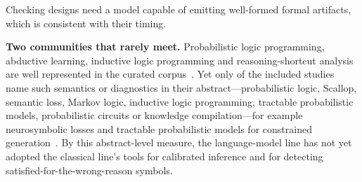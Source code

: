 Checking designs need a model capable of emitting well-formed formal artifacts, which is consistent with their timing.

\textbf{Two communities that rarely meet.} Probabilistic logic programming, abductive learning, inductive logic programming and reasoning-shortcut analysis are well represented in the curated corpus~\cite{huang2021scallop,maene2024hardness,marconato2023neuro,yang2024analysis}. Yet only  of the  included studies name such semantics or diagnostics in their abstract---probabilistic logic, Scallop, semantic loss, Markov logic, inductive logic programming, tractable probabilistic models, probabilistic circuits or knowledge compilation---for example neurosymbolic losses and tractable probabilistic models for constrained generation~\cite{ahmed2023pseudo,ahmed2025controllable,zhang2023tractable}. By this abstract-level measure, the language-model line has not yet adopted the classical line's tools for calibrated inference and for detecting satisfied-for-the-wrong-reason symbols.
